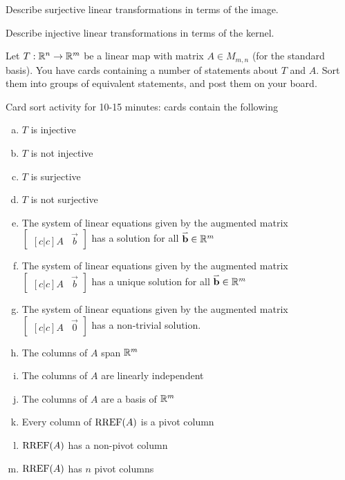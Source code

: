 
\begin{applicationActivities}{3}{19}
\begin{activity}{15}
  \begin{subactivity}
    Describe surjective linear transformations in terms of the image.
  \end{subactivity}
  \begin{subactivity}
    Describe injective linear transformations in terms of the kernel.
  \end{subactivity}
\end{activity}

\begin{activity}{15}
Let $T: \mathbb{R}^n \rightarrow \mathbb{R}^m$ be a linear map with matrix $A \in M_{m,n}$ (for the standard basis).  You have cards containing a number of statements about $T$ and $A$.  Sort them into groups of equivalent statements, and post them on your board.

\begin{TBLnote}Card sort activity for 10-15 minutes: cards contain the following
\begin{enumerate}[(a)]
\item $T$ is injective
\item $T$ is not injective
\item $T$ is surjective
\item $T$ is not surjective
\item The system of linear equations given by the augmented matrix $\begin{bmatrix}[c|c]A & \vec{b} \end{bmatrix}$ has a solution for all $\mathbf{\accentset{\rightharpoonup}{b}} \in \mathbb{R}^m$
\item The system of linear equations given by the augmented matrix $\begin{bmatrix}[c|c]A & \vec{b} \end{bmatrix}$ has a unique solution for all $\mathbf{\accentset{\rightharpoonup}{b}} \in \mathbb{R}^m$
\item The system of linear equations given by the augmented matrix $\begin{bmatrix}[c|c] A & \vec{0} \end{bmatrix}$ has a non-trivial solution.
\item The columns of $A$ span $\mathbb{R}^m$
\item The columns of $A$ are linearly independent
\item The columns of $A$ are a basis of $\mathbb{R}^m$
\item Every column of $\operatorname{RREF}(A)$ is a pivot column
\item $\operatorname{RREF}(A)$ has a non-pivot column
\item $\operatorname{RREF}(A)$ has $n$ pivot columns
\end{enumerate}
\end{TBLnote}
\end{activity}


\end{applicationActivities}
